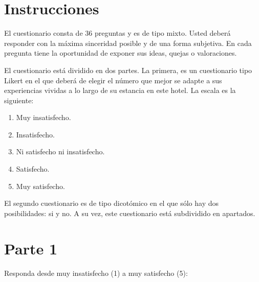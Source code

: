 \section*{Instrucciones}

El cuestionario consta de 36 preguntas y es de tipo mixto. Usted deberá responder con la máxima sinceridad posible y de una forma subjetiva. En cada pregunta tiene la oportunidad de exponer sus ideas, quejas o valoraciones.

El cuestionario está dividido en dos partes. La primera, es un cuestionario tipo Likert en el que deberá de elegir el número que mejor se adapte a sus experiencias vividas a lo largo de su estancia en este hotel. La escala es la siguiente:

\begin{enumerate}
	\item Muy insatisfecho.
	\item Insatisfecho.
	\item Ni satisfecho ni insatisfecho.
	\item Satisfecho.
	\item Muy satisfecho.

	\end{enumerate}
El segundo cuestionario es de tipo dicotómico en el que sólo hay dos posibilidades: si y no. A su vez, este cuestionario está subdividido en apartados.

\section*{Parte 1}
Responda desde muy insatisfecho (1) a muy satisfecho (5):

